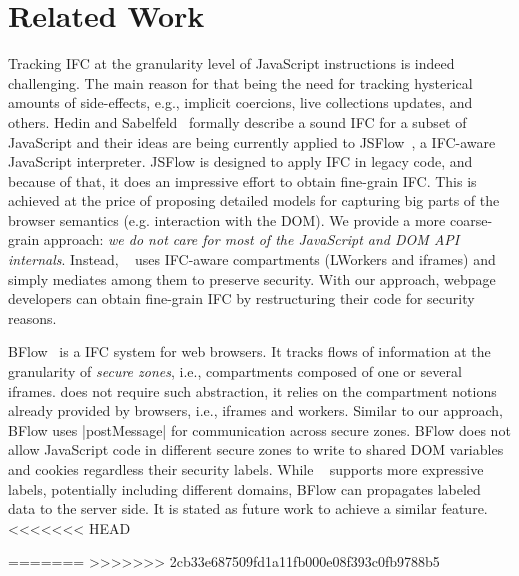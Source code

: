\section{Related Work}
\label{sec:related}


Tracking IFC at the granularity level of JavaScript instructions is indeed
challenging. The main reason for that being the need for tracking hysterical
amounts of side-effects, e.g., implicit coercions, live collections updates, and
others. Hedin and Sabelfeld~\cite{Hedin:2012} formally describe a sound IFC for
a subset of JavaScript and their ideas are being currently applied to
JSFlow~, a IFC-aware
JavaScript interpreter.  JSFlow is designed to apply IFC in legacy code, and
because of that, it does an impressive effort to obtain fine-grain IFC. This is
achieved at the price of proposing detailed models for capturing big parts of
the browser semantics (e.g. interaction with the DOM). We provide a more
coarse-grain approach: \emph{we do not care for most of the JavaScript and DOM
  API internals}. Instead, \sys~ uses IFC-aware compartments (LWorkers and
iframes) and simply mediates among them to preserve security. With our approach,
webpage developers can obtain fine-grain IFC by restructuring their code
for security reasons.

BFlow~\cite{Yip:2009:PBS} is a IFC system for web browsers. It tracks flows of information at the
granularity of \emph{secure zones}, i.e., compartments composed of one or
several iframes.  {\sys} does not require such abstraction, it relies on the
compartment notions already provided by browsers, i.e., iframes and
workers. Similar to our approach, BFlow uses \js|postMessage| for communication
across secure zones. BFlow does not allow JavaScript code in different secure
zones to write to shared DOM variables and cookies regardless their 
security labels.  While \sys~ supports more expressive labels, potentially
including different domains, BFlow can propagates labeled data to the server
side. It is stated as future work to achieve a similar feature.
<<<<<<< HEAD


=======
>>>>>>> 2cb33e687509fd1a11fb000e08f393c0fb9788b5

